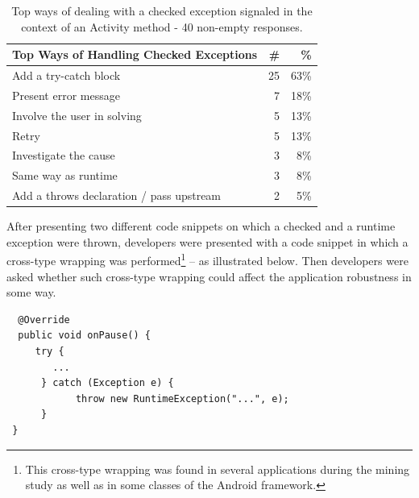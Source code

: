 \begin{table}
\scriptsize
\centering
\begin{tabular}{lrr}
\hline
\bfseries{Top Ways of Handling Checked Exceptions} & \bfseries{\#} & \bfseries{\%} \\
\hline
Add a try-catch block	& 25 &	63\% \\
Present error message	& 7 &	18\% \\
Involve the user in solving	& 5 &	13\% \\
Retry  &	5 &	13\% \\
Investigate the cause &	3 &	8\% \\
Same way as runtime	& 3 &	8\% \\
Add a throws declaration / pass upstream &	2 &	5\% \\
\hline
\end{tabular}
\caption{Top ways of dealing with a checked exception signaled in the context of an Activity method -  40 non-empty responses. }
\label{tab:handlingruntime}
\end{table}		


After presenting two different code snippets on which a checked and a runtime exception were thrown, developers were presented with a code snippet in which a cross-type wrapping was performed\footnote{This cross-type wrapping was found in several applications during the mining study as well as in some classes of the Android framework.} -- as illustrated below. Then developers were asked whether such cross-type wrapping could affect the application robustness in some way.

{\footnotesize
\begin{verbatim}
  @Override
  public void onPause() {
     try {
        ...
      } catch (Exception e) {
            throw new RuntimeException("...", e);
      }
 }
\end{verbatim}
}

